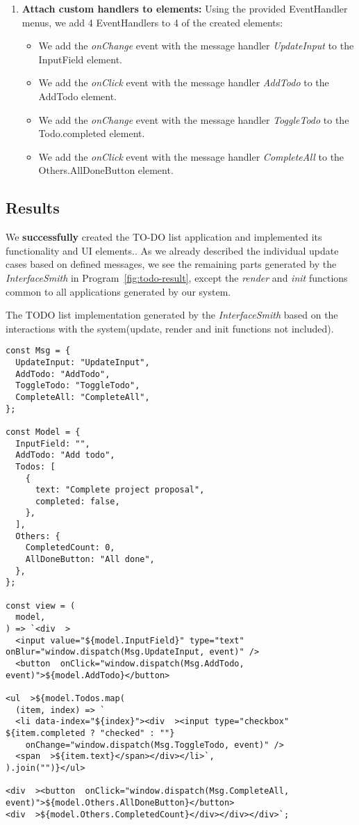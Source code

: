 \begin{enumerate}
\begin{itemize}
\end{itemize}

\item \textbf{Attach custom handlers to elements:} Using the provided EventHandler menus, we add 4 EventHandlers to 4 of the created elements:
\begin{itemize}
	\item We add the \emph{onChange} event with the message handler \emph{UpdateInput} to the InputField element.
	\item We add the \emph{onClick} event with the message handler \emph{AddTodo} to the AddTodo element.
	\item We add the \emph{onChange} event with the message handler \emph{ToggleTodo} to the Todo.completed element.
	\item We add the \emph{onClick} event with the message handler \emph{CompleteAll} to the Others.AllDoneButton element.
\end{itemize}
\end{enumerate}
\medskip
\subsection{Results}
We \textbf{successfully} created the TO-DO list application and implemented its functionality and UI elements..
As we already described the individual update cases based on defined messages, we see the remaining parts generated by the \emph{InterfaceSmith} in Program~\ref{fig:todo-result},
except the \emph{render} and \emph{init} functions common to all applications generated by our system.

\begin{listing}[p]
	\caption {The TODO list implementation generated by the \emph{InterfaceSmith} based on the interactions with the system(update, render and init functions not included).}
	\label{fig:todo-result}
	\begin{lstlisting}
const Msg = {
  UpdateInput: "UpdateInput",
  AddTodo: "AddTodo",
  ToggleTodo: "ToggleTodo",
  CompleteAll: "CompleteAll",
};

const Model = {
  InputField: "",
  AddTodo: "Add todo",
  Todos: [
    {
      text: "Complete project proposal",
      completed: false,
    },
  ],
  Others: {
    CompletedCount: 0,
    AllDoneButton: "All done",
  },
};

const view = (
  model,
) => `<div  >
  <input value="${model.InputField}" type="text" onBlur="window.dispatch(Msg.UpdateInput, event)" />
  <button  onClick="window.dispatch(Msg.AddTodo, event)">${model.AddTodo}</button>

<ul  >${model.Todos.map(
  (item, index) => `
  <li data-index="${index}"><div  ><input type="checkbox" ${item.completed ? "checked" : ""} 
    onChange="window.dispatch(Msg.ToggleTodo, event)" />
  <span  >${item.text}</span></div></li>`,
).join("")}</ul>

<div  ><button  onClick="window.dispatch(Msg.CompleteAll, event)">${model.Others.AllDoneButton}</button>
<div  >${model.Others.CompletedCount}</div></div></div>`;
\end{lstlisting}
\end{listing}

